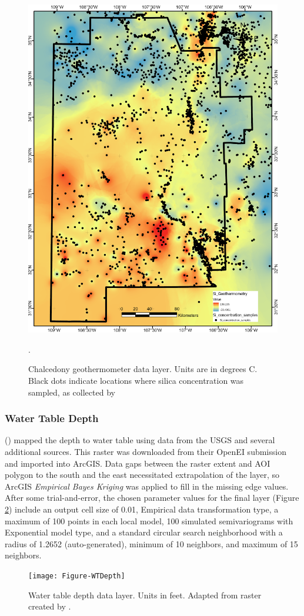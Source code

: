 \begin{figure}[!htp]
\centering
\includegraphics[scale=.50]{templates/images/Figure-SiTemp.png}
\caption[Silica geothermometer temperature data layer]{Chalcedony geothermometer data layer. Units are in degrees C. Black dots indicate locations where silica concentration was sampled, as collected by \protect\citet{bielicki_hydrogeolgic_2015}}.
\label{fig:feat_si_temp}
\end{figure}

\subsubsection{Water Table Depth}

\citeauthor{bielicki_hydrogeolgic_2015} (\citeyear{bielicki_hydrogeolgic_2015}) mapped the depth to water table using data from the USGS and several additional sources. This raster was downloaded from their OpenEI submission \citep{kelley_geothermal_2015} and imported into ArcGIS. Data gaps between the raster extent and AOI polygon to the south and the east necessitated extrapolation of the layer, so ArcGIS \textit{Empirical Bayes Kriging} was applied to fill in the missing edge values. After some trial-and-error, the chosen parameter values for the final layer (Figure \ref{fig:feat_wtdepth}) include an output cell size of 0.01, Empirical data transformation type, a maximum of 100 points in each local model, 100 simulated semivariograms with Exponential model type, and a standard circular search neighborhood with a radius of 1.2652 (auto-generated), minimum of 10 neighbors, and maximum of 15 neighbors.

\begin{figure}[!htp]
\centering
\texttt{[image: Figure-WTDepth]}
\caption[Water table depth data layer]{Water table depth data layer. Units in feet. Adapted from raster created by \protect\citep{bielicki_hydrogeolgic_2015}.}
\label{fig:feat_wtdepth}
\end{figure}